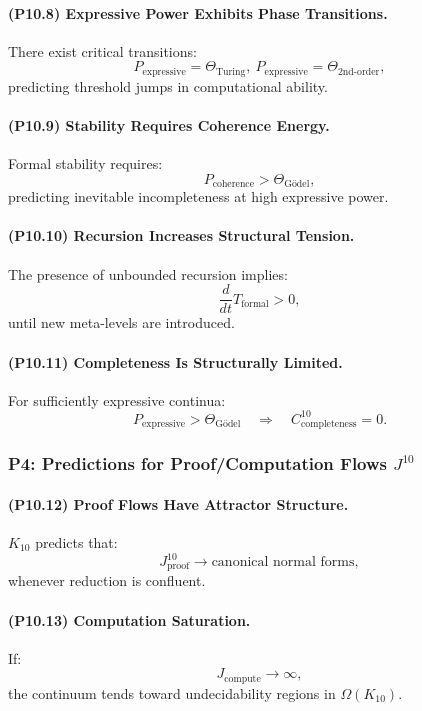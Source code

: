 \paragraph{(P10.8) Expressive Power Exhibits Phase Transitions.}
There exist critical transitions:
\[
P_{\mathrm{expressive}} = \Theta_{\mathrm{Turing}},\
P_{\mathrm{expressive}} = \Theta_{\mathrm{2nd\mbox{-}order}},
\]
predicting threshold jumps in computational ability.

\paragraph{(P10.9) Stability Requires Coherence Energy.}
Formal stability requires:
\[
P_{\mathrm{coherence}} > \Theta_{\mathrm{Gödel}},
\]
predicting inevitable incompleteness at high expressive power.

\paragraph{(P10.10) Recursion Increases Structural Tension.}
The presence of unbounded recursion implies:
\[
\frac{d}{dt} T_{\mathrm{formal}} > 0,
\]
until new meta-levels are introduced.

\paragraph{(P10.11) Completeness Is Structurally Limited.}
For sufficiently expressive continua:
\[
P_{\mathrm{expressive}} > \Theta_{\mathrm{Gödel}}
\quad \Rightarrow \quad
C_{\mathrm{completeness}}^{10} = 0.
\]

\subsubsection{P4: Predictions for Proof/Computation Flows $J^{10}$}

\paragraph{(P10.12) Proof Flows Have Attractor Structure.}
$K_{10}$ predicts that:
\[
J_{\mathrm{proof}}^{10} \to \text{canonical normal forms},
\]
whenever reduction is confluent.

\paragraph{(P10.13) Computation Saturation.}
If:
\[
J_{\mathrm{compute}} \to \infty,
\]
the continuum tends toward undecidability regions in $\Omega(K_{10})$.

